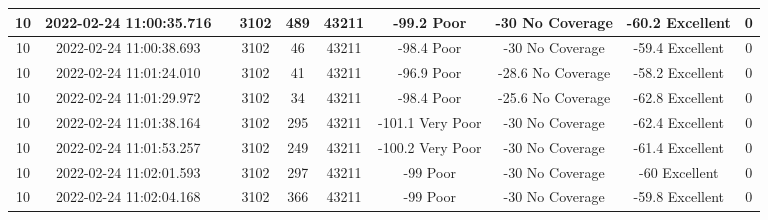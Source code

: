 \begin{longtable*}{|c|c|c|c|c|c|c|c|c|c|}
10&2022-02-24 11:00:35.716&&3102&489&43211& -99.2     Poor        & -30       No Coverage & -60.2     Excellent   & 0\\\hline
{}10&2022-02-24 11:00:38.693&&3102&46&43211& -98.4     Poor        & -30       No Coverage & -59.4     Excellent   & 0\\\hline
{}10&2022-02-24 11:01:24.010&&3102&41&43211& -96.9     Poor        & -28.6     No Coverage & -58.2     Excellent   & 0\\\hline
{}10&2022-02-24 11:01:29.972&&3102&34&43211& -98.4     Poor        & -25.6     No Coverage & -62.8     Excellent   & 0\\\hline
{}10&2022-02-24 11:01:38.164&&3102&295&43211& -101.1    Very Poor   & -30       No Coverage & -62.4     Excellent   & 0\\\hline
{}10&2022-02-24 11:01:53.257&&3102&249&43211& -100.2    Very Poor   & -30       No Coverage & -61.4     Excellent   & 0\\\hline
{}10&2022-02-24 11:02:01.593&&3102&297&43211& -99       Poor        & -30       No Coverage & -60       Excellent   & 0\\\hline
{}10&2022-02-24 11:02:04.168&&3102&366&43211& -99       Poor        & -30       No Coverage & -59.8     Excellent   & 0\\\hline

\end{longtable*}
